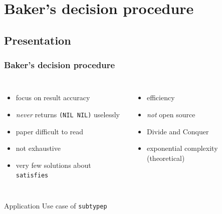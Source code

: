 \documentclass[aspectratio=169]{beamer}
\renewcommand\code[1]{\texttt{#1}}
\newcommand\rarr{\ensuremath{\rightarrow}}
\newcommand\plus{{\color{watchOS-blue}\faPlus}}
\newcommand\minus{{\color{watchOS-red}\faMinus}}
\begin{document}
\section{Baker's decision procedure}
\subsection{Presentation}

\begin{frame}
  \frametitle{Baker's decision procedure}
  \begin{columns}
    \column{.45\paperwidth}
    \begin{itemize}
    \item[\plus] focus on result accuracy
    \item[\plus] \emph{never} returns \code{(NIL NIL)} uselessly
      \pause
    \item[\minus] paper difficult to read
    \item[\minus] not exhaustive
    \item[\minus] very few solutions about \code{satisfies}
    \end{itemize}

    \pause
    \column{.45\paperwidth}
    \begin{itemize}
    \item[\plus] efficiency%
    \item[\minus] \emph{not} open source
      \pause
    \item[\plus] Divide and Conquer
    \item[\minus] exponential complexity (theoretical)
    \end{itemize}
  \end{columns}
\end{frame}

\begin{sectionframe}{Application}
  Use case of \code{subtypep}
\end{sectionframe}
\end{document}
